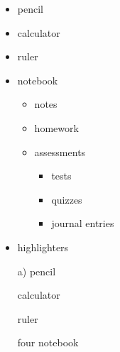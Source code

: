 \documentclass[11pt]{article}
\begin{document}
\begin{itemize}
\item pencil
\item calculator
\item ruler
\item notebook
  \begin{itemize}
  \item notes
  \item homework
  \item assessments
    \begin{itemize}
    \item tests
    \item quizzes
    \item journal entries
    \end{itemize}
  \end{itemize}
\item highlighters
\end{itemize}

\vspace{1cm}

\begin{enumerate}
\item[a)] pencil
\item[] calculator
\item[] ruler
\item[four] notebook
\end{enumerate}
\end{document}

